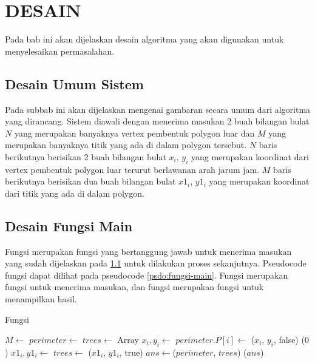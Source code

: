 \chapter{DESAIN}
\label{sec:desain}
Pada bab ini akan dijelaskan desain algoritma yang akan digunakan untuk menyelesaikan permasalahan.

\section{Desain Umum Sistem}
\label{sec:desain-umum-sistem}
Pada subbab ini akan dijelaskan mengenai gambaran secara umum dari algoritma yang dirancang. Sistem diawali dengan menerima masukan 2 buah bilangan bulat $N$ yang merupakan banyaknya vertex pembentuk polygon luar dan $M$ yang merupakan banyaknya titik yang ada di dalam polygon tersebut. $N$ baris berikutnya berisikan 2 buah bilangan bulat $x_i$, $y_i$ yang merupakan koordinat dari vertex pembentuk polygon luar terurut berlawanan arah jarum jam. $M$ baris berikutnya berisikan dua buah bilangan bulat $x1_i$, $y1_i$ yang merupakan koordinat dari titik yang ada di dalam polygon.

\section{Desain Fungsi Main}
Fungsi  merupakan fungsi yang bertanggung jawab untuk menerima masukan yang sudah dijelaskan pada \ref{sec:desain-umum-sistem} untuk dilakukan proses sekanjutnya. Pseudocode fungsi  dapat dilihat pada pseudocode \ref{psdo:fungsi-main}. Fungsi  merupakan fungsi untuk menerima masukan, dan fungsi  merupakan fungsi untuk menampilkan hasil. 

\begin{algorithm}
	\caption{Fungsi }
	\label{psdo:fungsi-main}
    \begin{algorithmic}[1]
            \State $M \leftarrow$ 
            \State $perimeter \leftarrow$ 
            \State $trees \leftarrow$ Array    
                \State $x_i , y_i \leftarrow $ 
                \State $perimeter.P[i]\leftarrow$ ($x_i$, $y_i$, false)
			\EndFor
				\State {}($0$)
				\State {}
			\EndIf
                \State $ x1_i , y1_i \leftarrow $ 
                \State $trees \leftarrow$ ($x1_i$, $y1_i$, true)
            \EndFor
            \State $ans \leftarrow $($perimeter$, $trees$)
            \State {} ($ans $)
        \EndWhile
	\end{algorithmic}
\end{algorithm}
